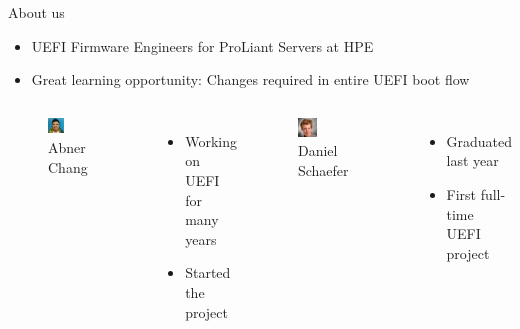\documentclass[
  10pt
]{beamer}
\begin{document}
\begin{frame}{About us}
  \begin{itemize}
    \item UEFI Firmware Engineers for ProLiant Servers at HPE
    \item Great learning opportunity: Changes required in entire  UEFI boot flow
  \end{itemize}

  \vfill

  \begin{columns}
    \begin{figure}[h]
      \includegraphics[width=0.3\textwidth]{resources/abner.jpg}
      \caption{Abner Chang}
    \end{figure}
    \begin{itemize}
      \item Working on UEFI for many years
      \item Started the project 
    \end{itemize}

    \begin{figure}[h]
      \includegraphics[width=0.3\textwidth]{resources/daniel.jpg}
      \caption{Daniel Schaefer}
    \end{figure}

    \begin{itemize}
      \item Graduated last year
      \item First full-time UEFI project
    \end{itemize}
  \end{columns}
\end{frame}
\end{document}
